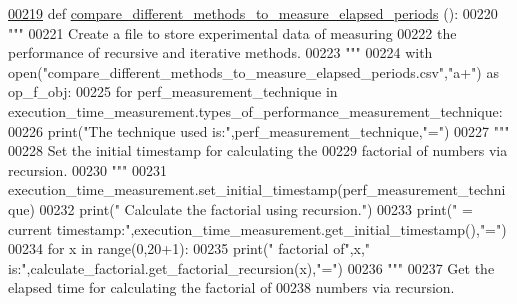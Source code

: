 \begin{DoxyCode}
\hypertarget{classutilities_1_1timing__measurements_1_1performance__measurement__no__ns_1_1execution__time__measurement_l00219}{}\hyperlink{classutilities_1_1timing__measurements_1_1performance__measurement__no__ns_1_1execution__time__measurement_a75eea39203f4d9b779977f9203f6d745}{00219}     \textcolor{keyword}{def }\hyperlink{classutilities_1_1timing__measurements_1_1performance__measurement__no__ns_1_1execution__time__measurement_a75eea39203f4d9b779977f9203f6d745}{compare\_different\_methods\_to\_measure\_elapsed\_periods}
      ():
00220         \textcolor{stringliteral}{"""}
00221 \textcolor{stringliteral}{            Create a file to store experimental data of measuring}
00222 \textcolor{stringliteral}{                the performance of recursive and iterative methods.}
00223 \textcolor{stringliteral}{        """}
00224         with open(\textcolor{stringliteral}{"compare\_different\_methods\_to\_measure\_elapsed\_periods.csv"},\textcolor{stringliteral}{"a+"}) \textcolor{keyword}{as} op\_f\_obj:
00225             \textcolor{keywordflow}{for} perf\_measurement\_technique \textcolor{keywordflow}{in} 
      execution\_time\_measurement.types\_of\_performance\_measurement\_technique:
00226                 print(\textcolor{stringliteral}{"The technique used is:"},perf\_measurement\_technique,\textcolor{stringliteral}{"="})
00227                 \textcolor{stringliteral}{"""}
00228 \textcolor{stringliteral}{                    Set the initial timestamp for calculating the}
00229 \textcolor{stringliteral}{                        factorial of numbers via recursion.}
00230 \textcolor{stringliteral}{                """}
00231                 execution\_time\_measurement.set\_initial\_timestamp(perf\_measurement\_technique)
00232                 print(\textcolor{stringliteral}{" Calculate the factorial using recursion."})
00233                 print(\textcolor{stringliteral}{" = current timestamp:"},execution\_time\_measurement.get\_initial\_timestamp(),\textcolor{stringliteral}{"="})
00234                 \textcolor{keywordflow}{for} x \textcolor{keywordflow}{in} range(0,20+1):
00235                     print(\textcolor{stringliteral}{"     factorial of"},x,\textcolor{stringliteral}{" is:"},calculate\_factorial.get\_factorial\_recursion(x),\textcolor{stringliteral}{"="})
00236                 \textcolor{stringliteral}{"""}
00237 \textcolor{stringliteral}{                    Get the elapsed time for calculating the factorial of}
00238 \textcolor{stringliteral}{                        numbers via recursion.}

\end{DoxyCode}
